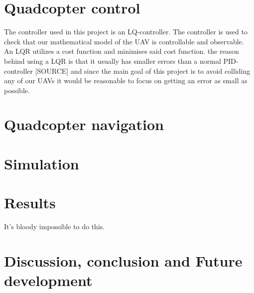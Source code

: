 \documentclass[journal]{IEEEtran}
\begin{document}
	\section{Quadcopter control}
	The controller used in this project is an LQ-controller. The controller is used to check that our mathematical model of the UAV is controllable and observable.  An LQR utilizes a cost function and minimises said cost function. the reason behind using a LQR is that it usually has smaller errors than a normal PID-controller [SOURCE] and since the main goal of this project is to avoid colliding any of our UAVs it would be reasonable to focus on getting an error as small as possible.   
	\section{Quadcopter navigation}
	
	\section{Simulation}
	
	
	\section{Results}
	It's bloody impossible to do this.
	
	\section{Discussion, conclusion and Future development}
	
	
	
	
	
\end{document}
